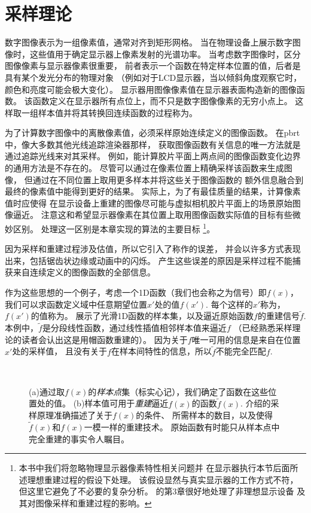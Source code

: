 \section{采样理论}\label{sec:采样理论}
数字图像表示为一组像素值，通常对齐到矩形网格。
当在物理设备上展示数字图像时，这些值用于确定显示器上像素发射的光谱功率。
当考虑数字图像时，区分图像像素与显示器像素很重要，
前者表示一个函数在特定样本位置的值，后者是具有某个发光分布的物理对象
（例如对于LCD显示器，当以倾斜角度观察它时，颜色和亮度可能会极大变化）。
显示器用图像像素值在显示器表面构造新的图像函数。
该函数定义在显示器所有点位上，而不只是数字图像像素的无穷小点上。
这样取一组样本值并将其转换回连续函数的过程称为。

为了计算数字图像中的离散像素值，必须采样原始连续定义的图像函数。
在pbrt中，像大多数其他光线追踪渲染器那样，
获取图像函数有关信息的唯一方法就是通过追踪光线来对其采样。
例如，能计算胶片平面上两点间的图像函数变化边界的通用方法是不存在的。
尽管可以通过在像素位置上精确采样该函数来生成图像，
但通过在不同位置上取用更多样本并将这些关于图像函数的
额外信息融合到最终的像素值中能得到更好的结果。
实际上，为了有最佳质量的结果，计算像素值时应使得
在显示设备上重建的图像尽可能与虚拟相机胶片平面上的场景原始图像逼近。
注意这和希望显示器像素在其位置上取用图像函数实际值的目标有些微妙区别。
处理这一区别是本章实现的算法的主要目标
\footnote{本书中我们将忽略物理显示器像素特性相关问题并
    在显示器执行本节后面所述理想重建过程的假设下处理。
    该假设显然与真实显示器的工作方式不符，但这里它避免了不必要的复杂分析。
    \citet{GLASSNER1995}的第3章很好地处理了非理想显示设备
    及其对图像采样和重建过程的影响。}。

因为采样和重建过程涉及估值，所以它引入了称作的误差，
并会以许多方式表现出来，包括锯齿状边缘或动画中的闪烁。
产生这些误差的原因是采样过程不能捕获来自连续定义的图像函数的全部信息。

作为这些思想的一个例子，考虑一个1D函数（我们也会称之为信号）即$f(x)$，
我们可以求函数定义域中任意期望位置$x'$处的值$f(x')$.
每个这样的$x'$称为，
$f(x')$的值称为。
展示了光滑1D函数的样本集，以及逼近原始函数$f$的重建信号$\tilde{f}$.
本例中，$\tilde{f}$是分段线性函数，通过线性插值相邻样本值来逼近$f$
（已经熟悉采样理论的读者会认出这是用帽函数重建的）。
因为关于$f$唯一可用的信息是来自在位置$x'$处的采样值，
且没有关于$f$在样本间特性的信息，所以$\tilde{f}$不能完全匹配$f$.
\begin{figure}[htbp]
    \centering
    \,\,
    \caption{(a)通过取$f(x)$的\emph{样本点}集（标实心记），我们确定了函数在这些位置处的值。
        (b)样本值可用于\emph{重建}逼近$f(x)$的函数$\tilde{f}(x)$.
        介绍的采样原理准确描述了关于$f(x)$的条件、
        所需样本的数目，以及使得$\tilde{f}(x)$和$f(x)$一模一样的重建技术。
        原始函数有时能只从样本点中完全重建的事实令人瞩目。}
    \label{fig:7.1}
\end{figure}

